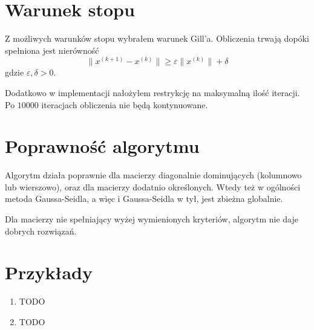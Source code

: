 \documentclass[12pt]{article}
\begin{document}
	\section{Warunek stopu}
	Z możliwych warunków stopu wybrałem warunek Gill'a. Obliczenia trwają dopóki spełniona jest nierówność
	$$
		\|x^{(k+1)} - x^{(k)}\| \geq \varepsilon \|x^{(k)}\| + \delta
	$$
	gdzie $\varepsilon, \delta > 0$.
	
	Dodatkowo w implementacji nałożyłem restrykcję na maksymalną ilość iteracji. Po $10000$ iteracjach obliczenia nie będą kontynuowane.
	
	\section{Poprawność algorytmu}
	Algorytm działa poprawnie dla macierzy diagonalnie dominujących (kolumnowo lub wierszowo), oraz dla macierzy dodatnio określonych. Wtedy też w ogólności metoda Gaussa-Seidla, a więc i Gaussa-Seidla w tył, jest zbieżna globalnie.
	
	Dla macierzy nie spełniający wyżej wymienionych kryteriów, algorytm nie daje dobrych rozwiązań.
	
	\section{Przykłady}
	\begin{enumerate}[label=\textbf{Układ \arabic*}]
		\item TODO
		
		\item TODO
		
	\end{enumerate}
\end{document}
